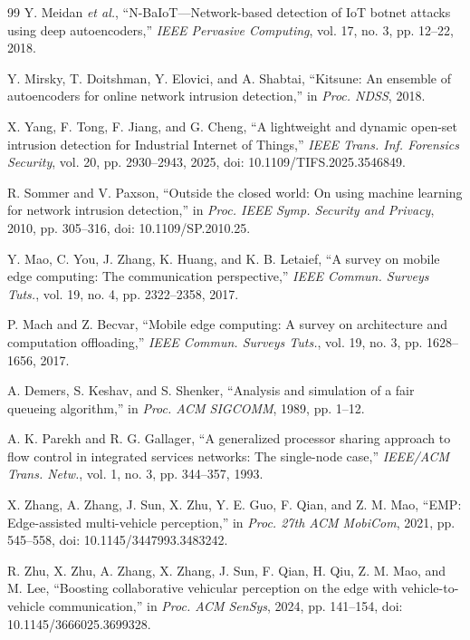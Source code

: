\documentclass[10pt,journal]{IEEEtran}
\begin{document}
\begin{thebibliography}{99}
Y. Meidan \emph{et al.}, ``N-BaIoT---Network-based detection of IoT botnet
attacks using deep autoencoders,'' \emph{IEEE Pervasive Computing}, vol. 17,
no. 3, pp. 12--22, 2018.

Y. Mirsky, T. Doitshman, Y. Elovici, and A. Shabtai,
``Kitsune: An ensemble of autoencoders for online network intrusion
detection,'' in \emph{Proc. NDSS}, 2018.

X. Yang, F. Tong, F. Jiang, and G. Cheng,
``A lightweight and dynamic open-set intrusion detection for Industrial
Internet of Things,'' \emph{IEEE Trans. Inf. Forensics Security}, vol. 20,
pp. 2930--2943, 2025, doi: 10.1109/TIFS.2025.3546849.

R. Sommer and V. Paxson, ``Outside the closed world: On using machine learning
for network intrusion detection,'' in \emph{Proc. IEEE Symp. Security and
Privacy}, 2010, pp. 305--316, doi: 10.1109/SP.2010.25.

Y. Mao, C. You, J. Zhang, K. Huang, and K. B. Letaief,
``A survey on mobile edge computing: The communication perspective,''
\emph{IEEE Commun. Surveys Tuts.}, vol. 19, no. 4, pp. 2322--2358, 2017.

P. Mach and Z. Becvar, ``Mobile edge computing: A survey on architecture and
computation offloading,'' \emph{IEEE Commun. Surveys Tuts.}, vol. 19, no. 3,
pp. 1628--1656, 2017.

A. Demers, S. Keshav, and S. Shenker,
``Analysis and simulation of a fair queueing algorithm,'' in
\emph{Proc. ACM SIGCOMM}, 1989, pp. 1--12.

A. K. Parekh and R. G. Gallager,
``A generalized processor sharing approach to flow control in integrated
services networks: The single-node case,'' \emph{IEEE/ACM Trans. Netw.},
vol. 1, no. 3, pp. 344--357, 1993.

X. Zhang, A. Zhang, J. Sun, X. Zhu, Y. E. Guo, F. Qian, and Z. M. Mao,
``EMP: Edge-assisted multi-vehicle perception,'' in \emph{Proc. 27th ACM
MobiCom}, 2021, pp. 545--558, doi: 10.1145/3447993.3483242.

R. Zhu, X. Zhu, A. Zhang, X. Zhang, J. Sun, F. Qian, H. Qiu,
Z. M. Mao, and M. Lee, ``Boosting collaborative vehicular perception on the
edge with vehicle-to-vehicle communication,'' in \emph{Proc. ACM SenSys},
2024, pp. 141--154, doi: 10.1145/3666025.3699328.


\end{thebibliography}
\end{document}
